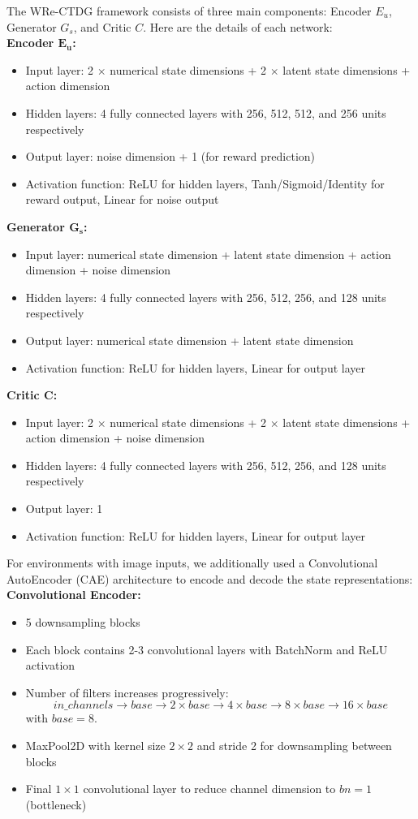 The WRe-CTDG framework consists of three main components:
Encoder $E_u$, Generator $G_s$, and Critic $C$.
Here are the details of each network:\\
\textbf{Encoder $\mathbf{E_u}$:}
\begin{itemize}
    \item Input layer: 2 $\times$ numerical state dimensions
    + 2 $\times$ latent state dimensions + action dimension
    \item Hidden layers: 4 fully connected layers with 256, 512, 512, and 256 units respectively
    \item Output layer: noise dimension + 1 (for reward prediction)
    \item Activation function: ReLU for hidden layers,
    Tanh/Sigmoid/Identity for reward output, Linear for noise output
\end{itemize}
\textbf{Generator $\mathbf{G_s}$:}
\begin{itemize}
    \item Input layer: numerical state dimension
    + latent state dimension + action dimension +
    noise dimension
    \item Hidden layers: 4 fully connected layers
    with 256, 512, 256, and 128 units respectively
    \item Output layer: numerical state dimension
    + latent state dimension
    \item Activation function: ReLU for hidden layers,
    Linear for output layer
\end{itemize}
\textbf{Critic $\mathbf{C}$:}
\begin{itemize}
    \item Input layer: 2 $\times$ numerical state dimensions
    + 2 $\times$ latent state dimensions + action dimension
    + noise dimension
    \item Hidden layers: 4 fully connected layers with 256,
    512, 256, and 128 units respectively
    \item Output layer: 1
    \item Activation function: ReLU
    for hidden layers, Linear for output layer
\end{itemize}
For environments with image inputs, we additionally used a
Convolutional AutoEncoder (CAE) architecture to
encode and decode the state representations:\\
\textbf{Convolutional Encoder:}
\begin{itemize}
    \item 5 downsampling blocks
    \item Each block contains 2-3 convolutional layers
    with BatchNorm and ReLU activation
    \item Number of filters increases progressively:
    $$ in\_channels \rightarrow base \rightarrow 2
    \times base \rightarrow 4\times base \rightarrow
    8\times base \rightarrow 16\times base $$
    with $base = 8$.
    \item MaxPool2D with kernel size $2\times 2$ and stride
    2 for downsampling between blocks
    \item Final $1\times 1$ convolutional layer to
    reduce channel dimension to $bn = 1$ (bottleneck)
\end{itemize}
